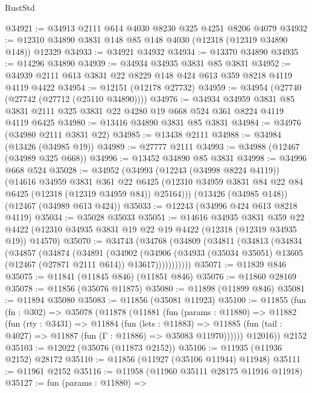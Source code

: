 \begin{lexlean}{RustStd}
\begin{coremodule}
@34921 := @34913 @2111 @614 @4030 @8230 @325 @4251 @8206 @4079
@34932 := @12310 @34890 @3831 @148 @85 @148 @4030 (@12318 (@12319 @34890 @148)) @12329
@34933 := @34921 @34932
@34934 := @13370 @34890
@34935 := @14296 @34890
@34939 := @34934 @34935 @3831 @85 @3831
@34952 := @34939 @2111 @613 @3831 @22 @8229 @148 @424 @613 @359 @8218 @4119 @4119 @4422
@34954 := @12151 (@12178 @27732)
@34959 := @34954 (@27740 (@27742 (@27712 (@25110 @34890))))
@34976 := @34934
    @34959
    @3831
    @85
    @3831
    @2111
    @325
    @3831
    @22
    @4280
    @19
    @668
    @524
    @361
    @8224
    @4119
    @4119
    @6425
@34980 := @13416 @34890 @3831 @85 @3831
@34984 := @34976 (@34980 @2111 @3831 @22)
@34985 := @13438 @2111
@34988 := @34984 (@13426 (@34985 @19))
@34989 := @27777 @2111
@34993 := @34988 (@12467 (@34989 @325 @668))
@34996 := @13452 @34890 @85 @3831
@34998 := @34996 @668 @524
@35028 := @34952
    (@34993
      (@12243 (@34998 @8224 @4119))
      (@14616
        @34959
        @3831
        @361
        @22
        @6425
        (@12310 @34959 @3831 @84 @22 @84 @6425 (@12318 (@12319 @34959 @84)) @25164)))
    (@13426 (@34985 @148))
    (@12467 (@34989 @613 @424))
@35033 := @12243 (@34996 @424 @613 @8218 @4119)
@35034 := @35028 @35033
@35051 := @14616
    @34935
    @3831
    @359
    @22
    @4422
    (@12310 @34935 @3831 @19 @22 @19 @4422 (@12318 (@12319 @34935 @19)) @14570)
@35070 := @34743
    (@34768
      (@34809
        (@34811
          (@34813
            (@34834
              (@34857
                (@34874
                  (@34891
                    (@34902
                      (@34906
                        (@34933
                          (@35034 @35051)
                          @13605
                          (@12467 (@27871 @2111 @614))
                          @13617)))))))))))
@35071 := @11839 @846
@35075 := @11841 (@11845 @846) (@11851 @846)
@35076 := @11860 @28169
@35078 := @11856 (@35076 @11875)
@35080 := @11898 (@11899 @846)
@35081 := @11894 @35080
@35083 := @11856 (@35081 @11923)
@35100 := @11855
    (fun (fn : @302) =>
    @35078
      (@11878
        (@11881
          (fun (params : @11880) =>
          @11882
            (fun (rty : @3431) =>
            @11884
              (fun (lets : @11883) =>
              @11885 (fun (tail : @4027) => @11887 (fun (Γ : @11886) => @35083 @11970))))))
        @12016))
    @2152
@35103 := @12022 (@35076 (@11873 @2152))
@35106 := @11935 (@11936 @2152) @28172
@35110 := @11856 (@11927 (@35106 @11944) @11948)
@35111 := @11961 @2152
@35116 := @11958 (@11960 @35111 @28175 @11916 @11918)
@35127 := fun (params : @11880) =>

\end{coremodule}
\end{lexlean}
